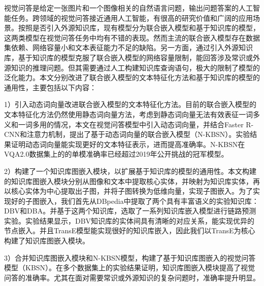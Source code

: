 	
\begin{chineseabstract}
视觉问答是给定一张图片和一个图像相关的自然语言问题，输出问题答案的人工智能任务。跨领域的视觉问答接近通用人工智能，有很高的研究价值和广阔的应用场景。按照是否引入外源知识库，现有模型分为联合嵌入模型和基于知识库的模型，这两类模型在视觉问答任务中均有不错的表现。然而主流的联合嵌入模型存在数据集依赖、网络容量小和文本表征能力不足的缺陷。另一方面，通过引入外源知识库，基于知识库的模型克服了联合嵌入模型的网络容量限制，能回答涉及常识或外源知识的推理问题。但其需要通过人工构建知识库查询语句，极大的限制了模型的泛化能力。本文分别改进了联合嵌入模型的文本特征化方法和基于知识库的模型的通用性，主要包括以下内容：

1）引入动态词向量改进联合嵌入模型的文本特征化方法。目前的联合嵌入模型的文本特征化方法仍然使用静态词向量方法，考虑到静态词向量无法有效表征一词多义和一词多用的情况，本文在视觉问答模型中引入动态词向量，并结合Faster R-CNN和注意力机制，提出了基于动态词向量的联合嵌入模型（N-KBSN）。实验结果证明动态词向量能实现更好的文本特征表示，进而提高准确率。N-KBSN在VQA2.0数据集上的的单模准确率已经超过2019年公开挑战的冠军模型。

2）构建了一个知识库图嵌入模块，以扩展基于知识库的模型的通用性。本文构建的知识库图嵌入模块分别从图像和文本中提取核心实体，并映射为知识库实体，再以核心实体为中心提取出子图，并将子图转换为低维向量，实现子图嵌入。为了实现好的子图嵌入，我们首先从DBpedia中提取了两个具有丰富语义的实验知识库：DBV和DBA。并基于这两个知识库，选取了一系列知识库嵌入模型进行链路预测实验。实验结果显示，DBV知识库的实体间具有清晰的对应关系，能实现优异的节点嵌入。并且TransE模型能实现很好的知识库嵌入，因此我们以TransE为核心构建了知识库图嵌入模块。

3）合并知识库图嵌入模块和N-KBSN模型，构建了基于知识库图嵌入的视觉问答模型（KBSN）。在多个数据集上的实验结果证明，知识库图嵌入模块提高了视觉问答的准确率。尤其在面对需要常识或外源知识的复杂问题时，准确率提升明显。

\end{chineseabstract}


